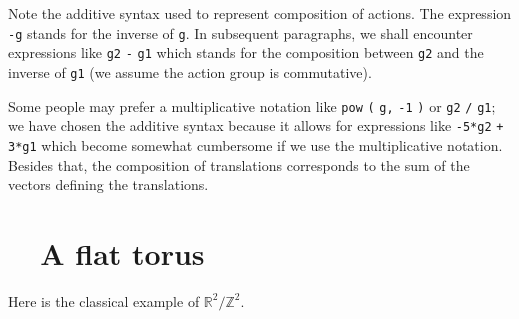 Note the additive syntax used to represent composition of actions.
The expression {\small\tt -g} stands for the inverse of {\small\tt g}.
In subsequent paragraphs, we shall encounter expressions like
{\small\tt g2} {\small\tt -} {\small\tt g1} which stands for the composition between
{\small\tt g2} and the inverse of {\small\tt g1} (we assume the action group is commutative).

Some people may prefer a multiplicative notation like {\small\tt pow} {\small\tt (} {\small\tt g,}
{\small\tt -1} {\small\tt )} or {\small\tt g2} {\small\tt /} {\small\tt g1};
we have chosen the additive syntax because it allows for expressions like {\small\tt -5*g2}
{\small\tt +} {\small\tt 3*g1} which become somewhat cumbersome if we use
the multiplicative notation.
Besides that, the composition of translations corresponds to the sum of the vectors
defining the translations.


\section{~~A flat torus}\label{\numb section 7.\numb parag 4}

Here is the classical example of $ \mathbb{R}^2/{\mathbb Z}^2 $.

